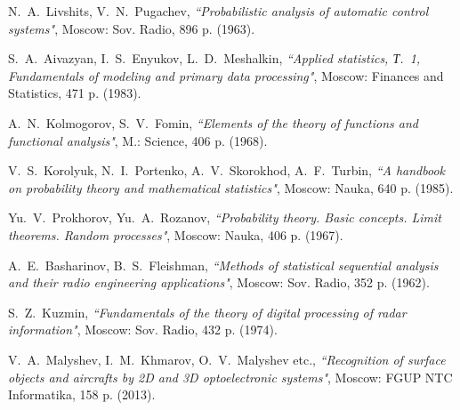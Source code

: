 \documentclass[
11pt,%
tightenlines,%
twoside,%
onecolumn,%
nofloats,%
nobibnotes,%
nofootinbib,%
superscriptaddress,%
noshowpacs,%
centertags]%
{revtex4}
\begin{document}
\begin{thebibliography}{99}
N.~A.~Livshits, V.~N.~Pugachev, {\it ``Probabilistic analysis of automatic control systems"}, Moscow: Sov. Radio, 896 p. (1963).

S.~A.~Aivazyan, I.~S.~Enyukov, L.~D.~Meshalkin, {\it ``Applied statistics, Т.~1, Fundamentals of modeling and primary data processing"},  Moscow: Finances and Statistics, 471 p. (1983).

A.~N.~Kolmogorov, S.~V.~Fomin, {\it ``Elements of the theory of functions and functional analysis"}, M.: Science, 406 p. (1968).

V.~S.~Korolyuk, N.~I.~Portenko, A.~V.~Skorokhod, A.~F.~Turbin, {\it ``A handbook on probability theory and mathematical statistics"}, Moscow: Nauka, 640 p. (1985).

Yu.~V.~Prokhorov, Yu.~A.~Rozanov, {\it ``Probability theory. Basic concepts. Limit theorems. Random processes"}, Moscow: Nauka, 406 p. (1967).

A.~E.~Basharinov, B.~S.~Fleishman, {\it ``Methods of statistical sequential analysis and their radio engineering applications"}, Moscow: Sov. Radio, 352 p. (1962).

S.~Z.~Kuzmin, {\it ``Fundamentals of the theory of digital processing of radar information"}, Moscow: Sov. Radio, 432 p. (1974).

V.~A.~Malyshev, I.~M.~Khmarov, O.~V.~Malyshev etc., {\it ``Recognition of surface objects and aircrafts by 2D and 3D optoelectronic systems"}, Moscow: FGUP NTC Informatika, 158 p. (2013).

\end{thebibliography}
\end{document}
